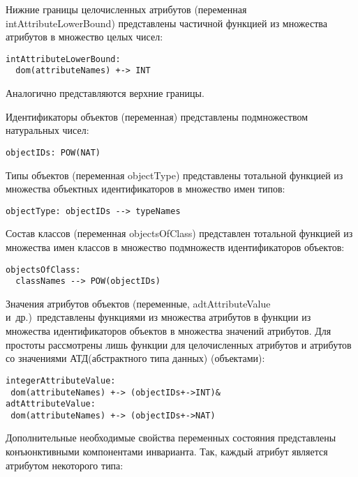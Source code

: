 \begin{multicols}{2}
        Нижние границы целочисленных атрибутов (переменная 
{\sf intAttributeLowerBound}) представлены час\-тич\-ной функцией из множества 
атрибутов в множество целых чисел:
\begin{verbatim}
intAttributeLowerBound: 
  dom(attributeNames) +-> INT
\end{verbatim}

        Аналогично представляются верхние границы.
        
        Идентификаторы объектов (переменная) представлены 
подмножеством натуральных чисел:
        \begin{verbatim}
objectIDs: POW(NAT)
\end{verbatim}

        Типы объектов (переменная {\sf objectType}) представлены тотальной 
функцией из множества объектных идентификаторов в множество имен типов:
\begin{verbatim}
objectType: objectIDs --> typeNames
\end{verbatim}

        Состав классов (переменная {\sf objectsOfClass}) представлен тотальной 
функцией из множества имен классов в множество подмножеств 
идентификаторов объектов:
        \begin{verbatim}
objectsOfClass: 
  classNames --> POW(objectIDs)
\end{verbatim}
        
        Значения атрибутов объектов (переменные, 
{\sf adtAttributeValue} и~др.)\ пред\-став\-ле\-ны функциями из множества атрибутов\linebreak 
в функции из множества идентификаторов объектов в множества значений 
атрибутов. Для простоты рассмотрены лишь функции для целочисленных 
атрибутов и атрибутов со значениями АТД\linebreak (абстрактного типа данных) (объектами):
        \begin{verbatim}
integerAttributeValue: 
 dom(attributeNames) +-> (objectIDs+->INT)& 
adtAttributeValue: 
 dom(attributeNames) +-> (objectIDs+->NAT)
\end{verbatim}
        
        Дополнительные необходимые свойства переменных состояния 
представлены конъюнктивными компонентами инварианта. Так, каждый 
атрибут является атрибутом некоторого типа:
        \begin{verbatim}
        

\end{verbatim}
\end{multicols}
